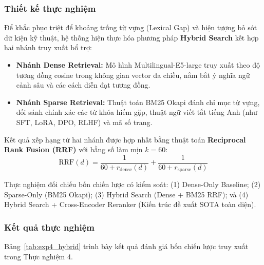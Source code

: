 ﻿\documentclass[12pt]{article}
\begin{document}
\subsubsection{Thiết kế thực nghiệm}

Để khắc phục triệt để khoảng trống từ vựng (Lexical Gap) và hiện tượng bỏ sót dữ kiện kỹ thuật, hệ thống hiện thực hóa phương pháp \textbf{Hybrid Search} kết hợp hai nhánh truy xuất bổ trợ:
\begin{itemize}
    \item \textbf{Nhánh Dense Retrieval:} Mô hình Multilingual-E5-large truy xuất theo độ tương đồng cosine trong không gian vector đa chiều, nắm bắt ý nghĩa ngữ cảnh sâu và các cách diễn đạt tương đồng.
    \item \textbf{Nhánh Sparse Retrieval:} Thuật toán BM25 Okapi \cite{robertson2009probabilistic} đánh chỉ mục từ vựng, đối sánh chính xác các từ khóa hiếm gặp, thuật ngữ viết tắt tiếng Anh (như SFT, LoRA, DPO, RLHF) và mã số trang.
\end{itemize}

Kết quả xếp hạng từ hai nhánh được hợp nhất bằng thuật toán \textbf{Reciprocal Rank Fusion (RRF)} \cite{cormack2009reciprocal} với hằng số làm mịn $k = 60$:
\begin{equation}
    \text{RRF}(d) = \frac{1}{60 + r_{\text{dense}}(d)} + \frac{1}{60 + r_{\text{sparse}}(d)}
\end{equation}

Thực nghiệm đối chiếu bốn chiến lược có kiểm soát:
(1) Dense-Only Baseline; (2) Sparse-Only (BM25 Okapi); (3) Hybrid Search (Dense + BM25 RRF); và (4) Hybrid Search + Cross-Encoder Reranker (Kiến trúc đề xuất SOTA toàn diện).

\subsubsection{Kết quả thực nghiệm}

Bảng~\ref{tab:exp4_hybrid} trình bày kết quả đánh giá bốn chiến lược truy xuất trong Thực nghiệm 4.
\end{document}
